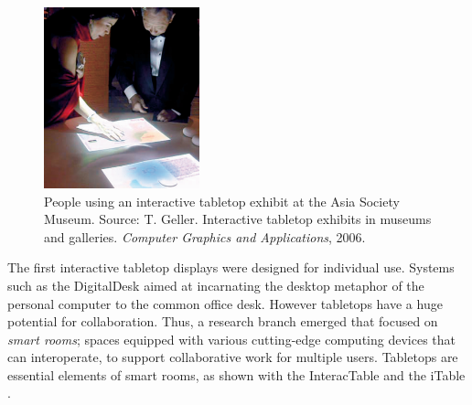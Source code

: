 \begin{figure}[htb]
  \centering
    \includegraphics[width=0.4\textwidth]{images/visitors}
  \caption{People using an interactive tabletop exhibit at the Asia Society Museum. Source: T. Geller. Interactive tabletop exhibits in museums and galleries. \emph{Computer Graphics and Applications}, 2006.}
  \label{fig:visitors}
\end{figure}

The first interactive tabletop displays were designed for individual use.
Systems such as the DigitalDesk \citep{Wellner:1993:digitaldesk} aimed at incarnating the desktop metaphor of the personal computer to the common office desk.
However tabletops have a huge potential for collaboration.
Thus, a research branch emerged that focused on \emph{smart rooms}; spaces equipped with various cutting-edge computing devices that can interoperate, to support collaborative work for multiple users.
Tabletops are essential elements of smart rooms, as shown with the InteracTable \citep{Streitz:1999:iland} and the iTable \citep{Johanson:2002:iroom}.

